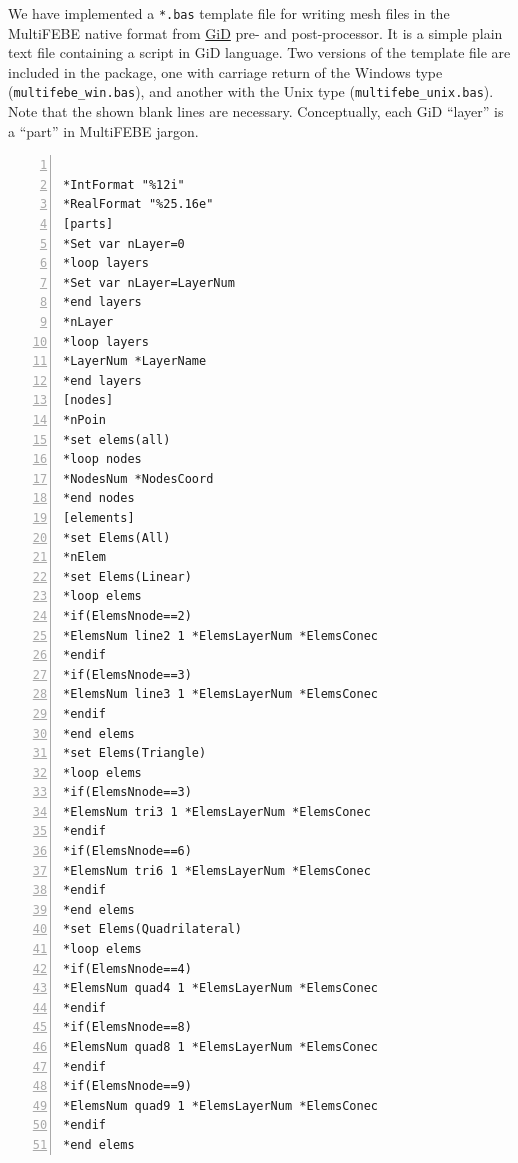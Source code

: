 \documentclass[a4paper,fleqn]{book}
\begin{document}
\label{ap:gid}

We have implemented a \texttt{*.bas} template file for writing mesh files in the MultiFEBE native format from \href{https://www.gidhome.com}{GiD} pre- and post-processor. It is a simple plain text file containing a script in GiD language. Two versions of the template file are included in the package, one with carriage return of the Windows type (\texttt{multifebe\_win.bas}), and another with the Unix type (\texttt{multifebe\_unix.bas}). Note that the shown blank lines are necessary. Conceptually, each GiD ``layer'' is a ``part'' in MultiFEBE jargon. 

\begin{Verbatim}[frame=single, fontsize=\small, label=multifebe\_win.bas \& multifebe\_unix.bas, numbers=left]

*IntFormat "%12i"
*RealFormat "%25.16e"
[parts]
*Set var nLayer=0
*loop layers
*Set var nLayer=LayerNum
*end layers
*nLayer
*loop layers
*LayerNum *LayerName
*end layers
[nodes]
*nPoin
*set elems(all)
*loop nodes
*NodesNum *NodesCoord
*end nodes
[elements]
*set Elems(All)
*nElem
*set Elems(Linear)
*loop elems
*if(ElemsNnode==2)
*ElemsNum line2 1 *ElemsLayerNum *ElemsConec
*endif
*if(ElemsNnode==3)
*ElemsNum line3 1 *ElemsLayerNum *ElemsConec
*endif
*end elems
*set Elems(Triangle)
*loop elems
*if(ElemsNnode==3)
*ElemsNum tri3 1 *ElemsLayerNum *ElemsConec
*endif
*if(ElemsNnode==6)
*ElemsNum tri6 1 *ElemsLayerNum *ElemsConec
*endif
*end elems
*set Elems(Quadrilateral)
*loop elems
*if(ElemsNnode==4)
*ElemsNum quad4 1 *ElemsLayerNum *ElemsConec
*endif
*if(ElemsNnode==8)
*ElemsNum quad8 1 *ElemsLayerNum *ElemsConec
*endif
*if(ElemsNnode==9)
*ElemsNum quad9 1 *ElemsLayerNum *ElemsConec
*endif
*end elems

\end{Verbatim}




\end{document}
